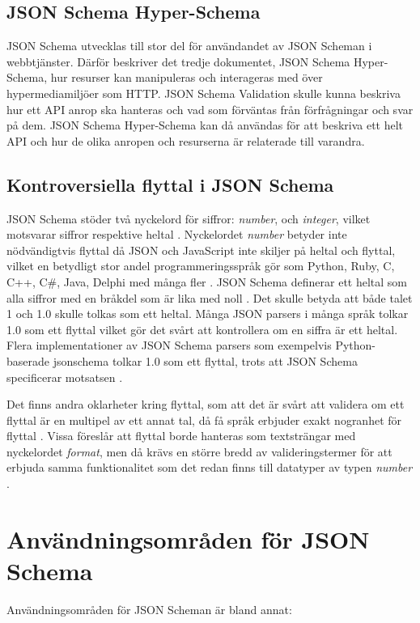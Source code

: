 \subsection{JSON Schema Hyper-Schema}
JSON Schema utvecklas till stor del för användandet av JSON Scheman i webbtjänster. Därför beskriver det tredje dokumentet, JSON Schema Hyper-Schema, hur resurser kan manipuleras och interageras med över hypermediamiljöer som HTTP. JSON Schema Validation skulle kunna beskriva hur ett API anrop ska hanteras och vad som förväntas från förfrågningar och svar på dem. JSON Schema Hyper-Schema kan då användas för att beskriva ett helt API och hur de olika anropen och resurserna är relaterade till varandra. \cite{Andrews2018a}

\subsection{Kontroversiella flyttal i JSON Schema}
\label{sec:teori:schema:float}

JSON Schema stöder två nyckelord för siffror: \textit{number}, och \textit{integer}, vilket motsvarar siffror respektive heltal \cite{Andrews}. Nyckelordet \textit{number} betyder inte nödvändigtvis flyttal då JSON och JavaScript inte skiljer på heltal och flyttal, vilket en betydligt stor andel programmeringsspråk gör som Python, Ruby, C, C++, C\#, Java, Delphi med många fler \cite{Embarcadero,Oracle,Microsofta,GNU,GNUa,Britt,Britta,PythonSoftwareFoundation2018,ECMA2013,EcmaInternational2017}. JSON Schema definerar ett heltal som alla siffror med en bråkdel som är lika med noll \cite{Andrews}. Det skulle betyda att både talet 1 och 1.0 skulle tolkas som ett heltal. Många JSON parsers i många språk tolkar 1.0 som ett flyttal vilket gör det svårt att kontrollera om en siffra är ett heltal. Flera implementationer av JSON Schema parsers som exempelvis Python-baserade jsonschema tolkar 1.0 som ett flyttal, trots att JSON Schema specificerar motsatsen \cite{SpaceTelescopeScienceInstitute2016}.

Det finns andra oklarheter kring flyttal, som att det är svårt att validera om ett flyttal är en multipel av ett annat tal, då få språk erbjuder exakt nogranhet för flyttal \cite{Cederqvist2017}. Vissa föreslår att flyttal borde hanteras som textsträngar med nyckelordet \textit{format}, men då krävs en större bredd av valideringstermer för att erbjuda samma funktionalitet som det redan finns till datatyper av typen \textit{number} \cite{Poberezkin,Faassen}.

\section{Användningsområden för JSON Schema}
\label{sec:teori:schema-användningsområden}
Användningsområden för JSON Scheman är bland annat:

